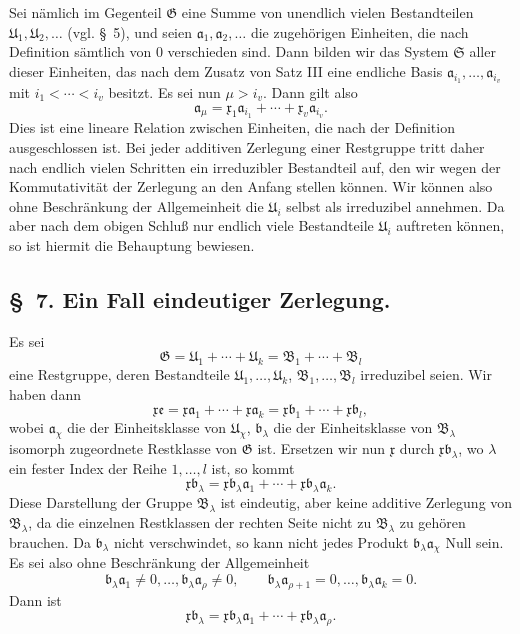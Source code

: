 \documentclass[11pt]{article}
\newcommand{\mG}{\mathfrak{G}}
\newcommand{\mB}{\mathfrak{B}}
\newcommand{\ma}{\mathfrak{a}}
\newcommand{\mb}{\mathfrak{b}}
\newcommand{\mx}{\mathfrak{x}}
\newcommand{\me}{\mathfrak{e}}
\providecommand{\mU}{\mathfrak{U}}
\providecommand{\mS}{\mathfrak{S}}
\begin{document}
Sei nämlich im Gegenteil $\mG$ eine Summe von unendlich vielen Bestandteilen $\mU_1,\mU_2,\ldots$ (vgl. \S~5), und seien $\ma_1,\ma_2,\ldots$ die zugehörigen Einheiten, die nach Definition sämtlich von $0$ verschieden sind. Dann bilden wir das System $\mS$ aller dieser Einheiten, das nach dem Zusatz von Satz III eine endliche Basis $\ma_{i_1},\ldots,\ma_{i_v}$ mit $i_1<\cdots<i_v$ besitzt. Es sei nun $\mu>i_v$. Dann gilt also
\[
 \ma_\mu=\mx_1\ma_{i_1}+\cdots+\mx_v\ma_{i_v}.
\]
Dies ist eine lineare Relation zwischen Einheiten, die nach der Definition ausgeschlossen ist. Bei jeder additiven Zerlegung einer Restgruppe tritt daher nach endlich vielen Schritten ein irreduzibler Bestandteil auf, den wir wegen der Kommutativität der Zerlegung an den Anfang stellen können. Wir können also ohne Beschränkung der Allgemeinheit die $\mU_i$ selbst als irreduzibel annehmen. Da aber nach dem obigen Schluß nur endlich viele Bestandteile $\mU_i$ auftreten können, so ist hiermit die Behauptung bewiesen.

\subsection*{\S~7. Ein Fall eindeutiger Zerlegung.}

Es sei
\[
 \mG=\mU_1+\cdots+\mU_k=\mB_1+\cdots+\mB_l
\]
eine Restgruppe, deren Bestandteile $\mU_1,\ldots,\mU_k$, $\mB_1,\ldots,\mB_l$ irreduzibel seien. Wir haben dann
\begin{equation}
 \mx\me=\mx\ma_1+\cdots+\mx\ma_k
 =\mx\mb_1+\cdots+\mx\mb_l,
\tag{22}
\end{equation}
wobei $\ma_\chi$ die der Einheitsklasse von $\mU_\chi$, $\mb_\lambda$ die der Einheitsklasse von $\mB_\lambda$ isomorph zugeordnete Restklasse von $\mG$ ist. Ersetzen wir nun $\mx$ durch $\mx\mb_\lambda$, wo $\lambda$ ein fester Index der Reihe $1,\ldots,l$ ist, so kommt
\begin{equation}
 \mx\mb_\lambda=\mx\mb_\lambda\ma_1+\cdots+\mx\mb_\lambda\ma_k.
\tag{23}
\end{equation}
Diese Darstellung der Gruppe $\mB_\lambda$ ist eindeutig, aber keine additive Zerlegung von $\mB_\lambda$, da die einzelnen Restklassen der rechten Seite nicht zu $\mB_\lambda$ zu gehören brauchen. Da $\mb_\lambda$ nicht verschwindet, so kann nicht jedes Produkt $\mb_\lambda\ma_\chi$ Null sein. Es sei also ohne Beschränkung der Allgemeinheit
\[
 \mb_\lambda\ma_1\ne0,
 \ldots,
 \mb_\lambda\ma_\rho\ne0,
 \qquad
 \mb_\lambda\ma_{\rho+1}=0,
 \ldots,
 \mb_\lambda\ma_k=0.
\]
Dann ist
\[
 \mx\mb_\lambda=\mx\mb_\lambda\ma_1+\cdots+\mx\mb_\lambda\ma_\rho.
\]
\end{document}
